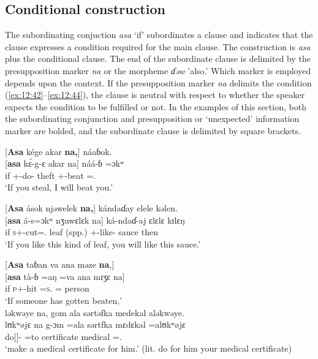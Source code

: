 \subsection{Conditional construction}\label{sec:12.3.2}
\hypertarget{RefHeading1213461525720847}{}
The subordinating conjuction \textit{asa} ‘if’ subordinates a clause and indicates that the clause expresses a condition required for the main clause. The construction is \textit{asa} plus the conditional clause.  The end of the subordinate clause is delimited by the presupposition marker \textit{na} or the morpheme \textit{ɗəw} 'also.' Which marker is employed depends upon the context. If the presupposition marker \textit{na} delimits the condition (\ref{ex:12:42}--\ref{ex:12:44}), the clause is neutral with respect to whether the speaker expects the condition to be fulfilled or not.  In the examples of this section, both the subordinating conjunction and presupposition or ‘unexpected’ information marker are bolded, and the subordinate clause is delimited by square brackets.


\ea \label{ex:12:42}
{}[\textbf{Asa} kége  akar  \textbf{na,}]  náaɓok.\\
\gll  {}[\textbf{asa}  k\'{ɛ}-g-ɛ     akar   na]  náá-ɓ =ɔkʷ\\
      if    {\twoS}+{\IFV}-do-{\CL}  theft  {\PSP}  {\oneS}+{\POT}-beat ={\twoS}.{\IO}\\
\glt  ‘If you steal, I will beat you.’
\z  

\ea \label{ex:12:43}
{}[\textbf{Asa} ások njəwelek  \textbf{na,}]  kándaɗay  elele  kəlen.\\
\gll  {}[\textbf{asa} á-s=ɔkʷ       nʒuwɛlɛk  na]  ká-ndaɗ-aj  ɛlɛlɛ  kɪlɛŋ\\
      if  \textsc{s}+{\IFV}-cut={\twoS}.{\IO}  {leaf (spp.)}  {\PSP}  {\twoS}+{\IFV}-like{}-{\CL}  sauce  then\\
\glt  ‘If you like this kind of leaf, you will like this sauce.’  
\z 

\ea \label{ex:12:44}
{} [\textbf{Asa}  taɓan  va  ana  məze  \textbf{na},] \\ 
\gll  {}[\textbf{asa}  tà-ɓ    =aŋ  =va  ana  mɪʒɛ  na]\\ 
      if  \textsc{p}+{\PFV}-hit  =\textsc{s}.{\IO}  ={\PRF}  {\DAT} person  {\PSP} \\     
\glt ‘If someone has gotten beaten,’\\

\medskip
ləkwəye  na,  gom  ala  sərtəfka  medekal  aləkwəye.\\
\gll lʊkʷøjɛ na g-ɔm =ala sərtfka mɛdɛkal =alʊkʷøjɛ\\
     {\twoP}    {\PSP}   do[{\IMP}]-{\twoP}   =to  certificate  medical    ={\twoP}.{\POSS} \\
 \glt  ‘make a medical certificate for him.’ (lit. do for him your medical certificate)
\z 

